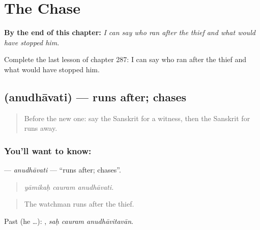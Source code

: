 
\chapter{The Chase}
\label{ch:sa-the-chase}

\begin{chapteropening}
\textbf{By the end of this chapter:} \emph{I can say who ran after the thief and what would have stopped him.}

Complete the last lesson of chapter 287: I can say who ran after the thief and what would have stopped him.
\end{chapteropening}

\section[\texorpdfstring{\sk{अनुधावति} (anudhāvati)}{अनुधावति (anudhāvati)}]{ (anudhāvati) — runs after; chases}

\label{lesson:SA-C287-anudhavati}



\begin{quote}
Before the new one: say the Sanskrit for a witness, then the Sanskrit for runs away.
\end{quote}

\subsection*{You'll want to know: }
\textbf{} — \emph{anudhāvati} — \textquotedblleft{}runs after; chases\textquotedblright{}.

\begin{quote}
  
\end{quote}

\begin{quote}
\emph{yāmikaḥ cauram anudhāvati.}
\end{quote}

\begin{quote}
The watchman runs after the thief.
\end{quote}

Past (he …):   , \emph{saḥ cauram anudhāvitavān}.

